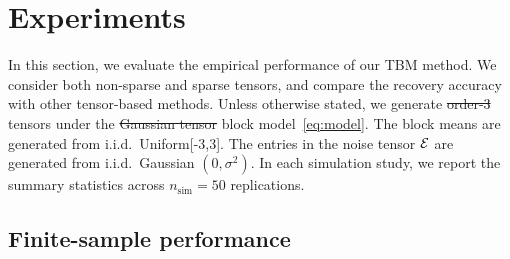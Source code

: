 \documentclass[11pt]{article}
\theoremstyle{plain}
\theoremstyle{definition}
\providecommand{\DIFaddtex}[1]{{\protect\color{blue}\uwave{#1}}} %
\providecommand{\DIFdeltex}[1]{{\protect\color{red}\sout{#1}}}                      %
\providecommand{\DIFaddbegin}{} %
\providecommand{\DIFaddend}{} %
\providecommand{\DIFdelbegin}{} %
\providecommand{\DIFdelend}{} %
\providecommand{\DIFadd}[1]{\texorpdfstring{\DIFaddtex{#1}}{#1}} %
\providecommand{\DIFdel}[1]{\texorpdfstring{\DIFdeltex{#1}}{}} %
\begin{document}
\DIFaddbegin \vspace{-.2cm}
\DIFaddend \section{Experiments}\label{sec:simulation}
\DIFdelbegin %

\DIFdelend \DIFaddbegin \vspace{-.2cm}
\DIFaddend In this section, we evaluate the empirical performance of our TBM method. We consider both non-sparse and sparse tensors, and compare the recovery accuracy with other tensor-based methods. Unless otherwise stated, we generate \DIFdelbegin \DIFdel{order-3 }\DIFdelend \DIFaddbegin \DIFadd{Gaussian }\DIFaddend tensors under the \DIFdelbegin \DIFdel{Gaussian tensor }\DIFdelend block model~\eqref{eq:model}. The block means are generated from  i.i.d.\ Uniform[-3,3]. The entries in the noise tensor $\mathcal{E}$ are generated from i.i.d.\ Gaussian $(0,\sigma^2)$. In each simulation study, we report the summary statistics across $n_{\text{sim}}=50$ replications. 

\DIFaddbegin 

\DIFaddend \subsection{Finite-sample performance}
\DIFaddbegin \vspace{-.2cm}
\DIFaddend 

\DIFaddbegin 
\end{document}
